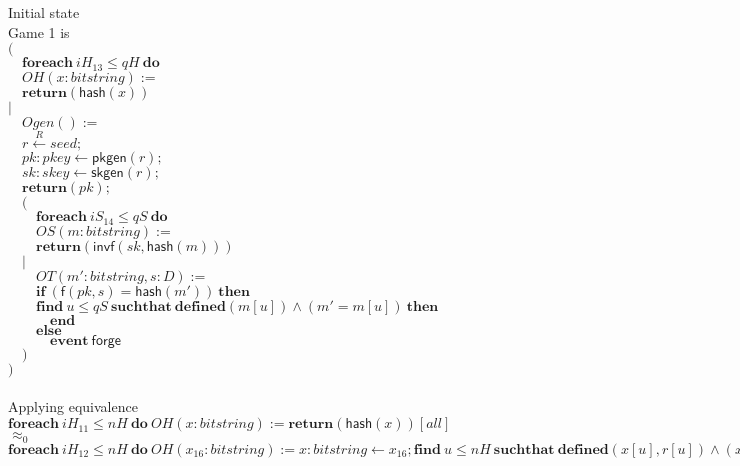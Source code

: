 \documentclass{article}
\newcommand{\store}{\leftarrow}
\newcommand{\getR}{\stackrel{R}{\store}}
\newcommand{\kw}[1]{\mathbf{#1}}
\newcommand{\kwf}[1]{\mathsf{#1}}
\newcommand{\var}[1]{\mathit{#1}}
\newcommand{\kwt}[1]{\mathit{#1}}
\newcommand{\kwp}[1]{\mathit{#1}}
\begin{document}
\begin{tabbing}
Initial state\\
Game 1 is\\
$($\\
$\quad \kw{foreach}\ \var{iH}_{13} \leq \kwp{qH}\ \kw{do}$\\
$\quad OH(\var{x}: \kwt{bitstring}) :=$\\
$\quad \kw{return}\kwf{}(\kwf{hash}(\var{x}))$\\
$|$\\
$\quad Ogen() :=$\\
$\quad \var{r} \getR \kwt{seed};$\\
$\quad \var{pk}: \kwt{pkey} \store \kwf{pkgen}(\var{r});$\\
$\quad \var{sk}: \kwt{skey} \store \kwf{skgen}(\var{r});$\\
$\quad \kw{return}\kwf{}(\var{pk});$\\
$\quad ($\\
$\quad \quad \kw{foreach}\ \var{iS}_{14} \leq \kwp{qS}\ \kw{do}$\\
$\quad \quad OS(\var{m}: \kwt{bitstring}) :=$\\
$\quad \quad \kw{return}\kwf{}(\kwf{invf}(\var{sk}, \kwf{hash}(\var{m})))$\\
$\quad |$\\
$\quad \quad OT(\var{m'}: \kwt{bitstring}, \var{s}: \kwt{D}) :=$\\
$\quad \quad \kw{if}\ (\kwf{f}(\var{pk}, \var{s})  =  \kwf{hash}(\var{m'}))\ \kw{then}$\\
$\quad \quad \kw{find}\ \var{u} \leq \kwp{qS}\ \kw{suchthat}\ \kw{defined}(\var{m}[\var{u}])\wedge (\var{m'}  =  \var{m}[\var{u}])\ \kw{then}$\\
$\quad \quad \quad \kw{end}$\\
$\quad \quad \kw{else}$\\
$\quad \quad \quad \kw{event}\ \kwf{forge}$\\
$\quad )$\\
$)$\\
$ $\\
\\
Applying equivalence\\
$\kw{foreach}\ \var{iH}_{11} \leq \kwp{nH}\ \kw{do}\ OH(\var{x}: \kwt{bitstring}) := \kw{return}(\kwf{hash}(\var{x})) [all]$\\
$\approx_{0}$\\
$\kw{foreach}\ \var{iH}_{12} \leq \kwp{nH}\ \kw{do}\ OH(\var{x}_{16}: \kwt{bitstring}) := \var{x}: \kwt{bitstring} \store \var{x}_{16}; \kw{find}\ \var{u} \leq \kwp{nH}\ \kw{suchthat}\ \kw{defined}(\var{x}[\var{u}], \var{r}[\var{u}])\wedge (\var{x}  =  \var{x}[\var{u}])\ \kw{then}\ \kw{return}(\var{r}[\var{u}])$\\

\end{tabbing}
\end{document}
